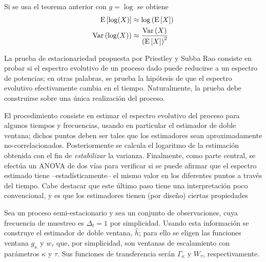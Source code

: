 \begin{corolario}
Si se usa el teorema anterior con $g = \log$ se obtiene
\begin{align}
\mathrm{E}\left[ \log(X) \right] &\approx \log\left( \mathrm{E}\left[ X \right] \right) \\
\mathrm{Var}\left( \log(X) \right) &\approx \frac{\mathrm{Var}\left( X \right)}{\left( \mathrm{E}\left[ X \right] \right)^{2}}
\end{align}
\end{corolario}

La prueba de estacionariedad propuesta por Priestley y Subba Rao \cite{Priestley69} consiste en 
probar si el espectro evolutivo de un proceso dado puede reducirse a un espectro de potencias; en otras palabras, se prueba la hipótesis de que el espectro evolutivo efectivamente cambia en el tiempo. 
%
Naturalmente, la prueba debe construirse sobre una única realización del proceso.

El procedimiento consiste en estimar el espectro evolutivo del proceso para algunos tiempos y frecuencias, usando en particular el estimador de doble ventana; dichos puntos deben ser tales que los estimadores sean aproximadamente no-correlacionados.
%
Posteriormente se calcula el logaritmo de la estimación obtenida con el fin de \textit{estabilizar} la varianza.
%
Finalmente, como parte central, se efectúa un ANOVA de dos vías para verificar si se puede afirmar que el espectro estimado tiene --estadísticamente-- el mismo valor en los diferentes puntos a través del tiempo.
%
Cabe destacar que este último paso tiene una interpretación poco convencional, y es que los estimadores tienen (por diseño) ciertas propiedades

Sea \xt un proceso semi-estacionario y sea \xtd un conjunto de observaciones, cuya frecuencia de 
muestreo es $\Delta_t=1$ por simplicidad.
%
Usando esta información se construye el estimador de doble ventana, $\widehat{h}$; para ello se eligen las funciones ventana $g_\kappa$ y $w_\tau$ que, por simplicidad, son ventanas de escalamiento con parámetros $\kappa$ y $\tau$. Sus funciones de transferencia serán $\Gamma_\kappa$ y $W_\tau$, respectivamente.

